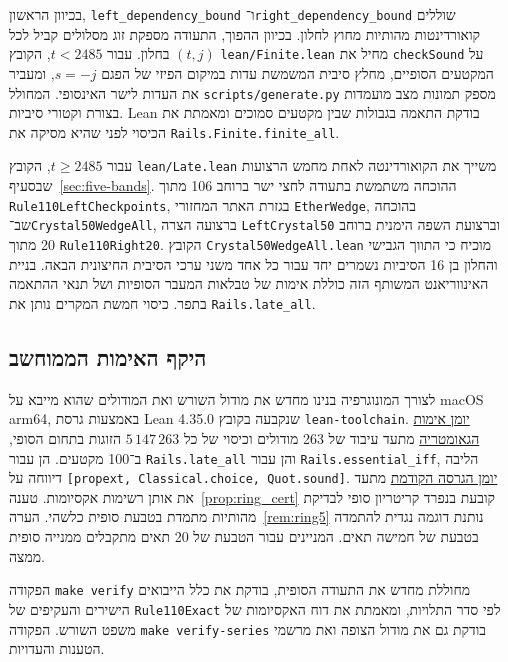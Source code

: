 \documentclass[11pt,a4paper]{article}
\DeclareRobustCommand{\textenglish}[1]{\foreignlanguage{english}{#1}}
\newcommand{\src}[2]{\href{https://github.com/Dnarts/rule110-dependency-fronts/blob/v2.2.1-monograph-multilingual/#1}{#2}}
\theoremstyle{definition}
\begin{document}
בכיוון הראשון, \textenglish{\texttt{left\_dependency\_bound}} ו־\textenglish{\texttt{right\_dependency\_bound}} שוללים קואורדינטות מהותיות מחוץ לחלון. בכיוון ההפוך, התעודה מספקת זוג מסלולים קביל לכל $(t,j)$ בחלון. עבור $t<2485$, הקובץ \textenglish{\texttt{lean/Finite.lean}} מחיל את \textenglish{\texttt{checkSound}} על המקטעים הסופיים, מחלץ סיבית המשמשת עדות במיקום הפיזי של הפגם $s=-j$, ומעביר את העדות לישר האינסופי. המחולל \textenglish{\texttt{scripts/generate.py}} מספק תמונות מצב מועמדות בצורת וקטורי סיביות. \textenglish{Lean} בודקת התאמה בגבולות שבין מקטעים סמוכים ומאמתת את הכיסוי לפני שהיא מסיקה את \textenglish{\texttt{Rails.Finite.finite\_all}}.

עבור $t\ge2485$, הקובץ \textenglish{\texttt{lean/Late.lean}} משייך את הקואורדינטה לאחת מחמש הרצועות שבסעיף~\ref{sec:five-bands}. ההוכחה משתמשת בתעודה לחצי ישר ברוחב 106 מתוך \textenglish{\texttt{Rule110LeftCheckpoints}}, בגזרת האתר המחזורי \textenglish{\texttt{EtherWedge}}, בהוכחה שב־\textenglish{\texttt{Crystal50WedgeAll}}, ברצועה הצרה \textenglish{\texttt{LeftCrystal50}} וברצועת השפה הימנית ברוחב 20 מתוך \textenglish{\texttt{Rule110Right20}}. הקובץ \textenglish{\texttt{Crystal50WedgeAll.lean}} מוכיח כי התווך הגבישי והחלון בן 16 הסיביות נשמרים יחד עבור כל אחד משני ערכי הסיבית החיצונית הבאה. בניית האינווריאנט המשותף הזה כוללת אימות של טבלאות המעבר הסופיות ושל תנאי ההתאמה בתפר. כיסוי חמשת המקרים נותן את \textenglish{\texttt{Rails.late\_all}}.

\subsection{היקף האימות הממוחשב}
לצורך המונוגרפיה בנינו מחדש את מודול השורש ואת המודולים שהוא מייבא על \textenglish{macOS arm64}, באמצעות גרסת \textenglish{Lean 4.35.0} שנקבעה בקובץ \textenglish{\texttt{lean-toolchain}}. \src{verification/monograph/geometry-axioms.log}{יומן אימות הגאומטריה} מתעד עיבוד של 263 מודולים וכיסוי של כל $5\,147\,263$ הזוגות בתחום הסופי, ב־100 מקטעים. הן עבור \textenglish{\texttt{Rails.late\_all}} והן עבור \textenglish{\texttt{Rails.essential\_iff}}, הליבה דיווחה על \textenglish{\texttt{[propext, Classical.choice, Quot.sound]}}. \src{verification/v2/final.log}{יומן הגרסה הקודמת} מתעד את אותן רשימות אקסיומות. טענה~\ref{prop:ring_cert} קובעת בנפרד קריטריון סופי לבדיקת מהותיות מתמדת בטבעת סופית כלשהי. הערה~\ref{rem:ring5} נותנת דוגמה נגדית להתמדה בטבעת של חמישה תאים. המניינים עבור הטבעת של 20 תאים מתקבלים ממנייה סופית ממצה.

הפקודה \textenglish{\texttt{make verify}} מחוללת מחדש את התעודה הסופית, בודקת את כלל הייבואים הישירים והעקיפים של \textenglish{\texttt{Rule110Exact}} לפי סדר התלויות, ומאמתת את דוח האקסיומות של משפט השורש. הפקודה \textenglish{\texttt{make verify-series}} בודקת גם את מודול הצופה ואת מרשמי הטענות והעדויות.
\end{document}
